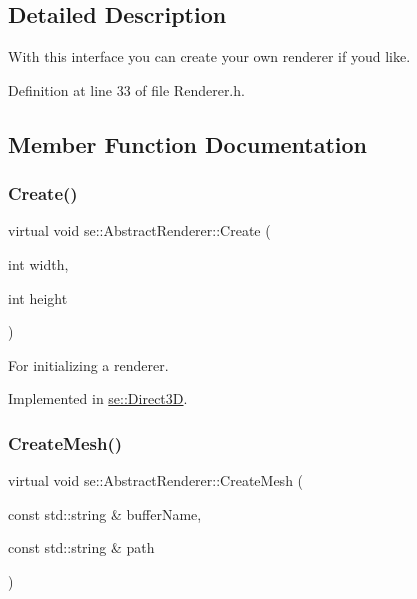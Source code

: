 \subsection{Detailed Description}
With this interface you can create your own renderer if you\textquotesingle{}d like. 

Definition at line 33 of file Renderer.\+h.



\subsection{Member Function Documentation}
\mbox{\label{classse_1_1_abstract_renderer_a3b0c7d8dc34c56513b3160e2cf1e094a}} 
\subsubsection{\texorpdfstring{Create()}{Create()}}
{\footnotesize\ttfamily virtual void se\+::\+Abstract\+Renderer\+::\+Create (\begin{DoxyParamCaption}\item[{int}]{width,  }\item[{int}]{height }\end{DoxyParamCaption})\hspace{0.3cm}{\ttfamily [pure virtual]}}

For initializing a renderer. 

Implemented in \mbox{\hyperlink{classse_1_1_direct3_d_af88b0fb33fe5bff1112213e6c8faf466}{se\+::\+Direct3D}}.

\mbox{\label{classse_1_1_abstract_renderer_a4a3e8836f7a8b1b35a5f7cb1b4231476}} 
\subsubsection{\texorpdfstring{Create\+Mesh()}{CreateMesh()}}
{\footnotesize\ttfamily virtual void se\+::\+Abstract\+Renderer\+::\+Create\+Mesh (\begin{DoxyParamCaption}\item[{const std\+::string \&}]{buffer\+Name,  }\item[{const std\+::string \&}]{path }\end{DoxyParamCaption})\hspace{0.3cm}{\ttfamily [pure virtual]}}

